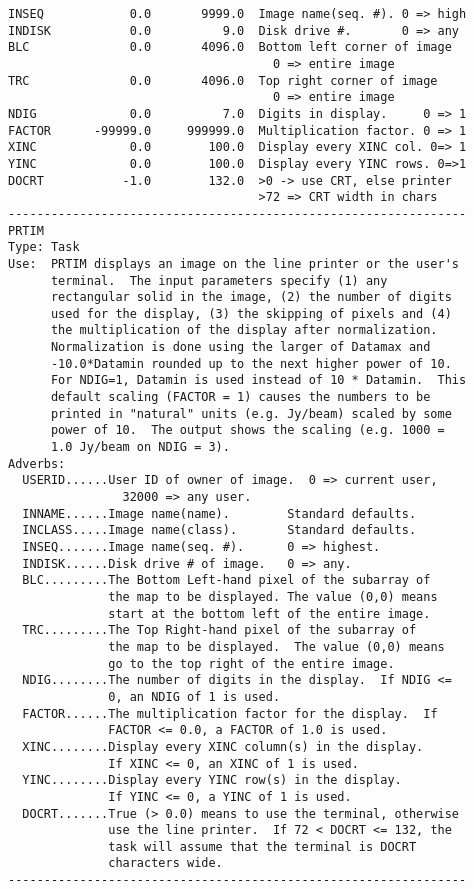 \begin{verbatim}
INSEQ            0.0       9999.0  Image name(seq. #). 0 => high
INDISK           0.0          9.0  Disk drive #.       0 => any
BLC              0.0       4096.0  Bottom left corner of image
                                     0 => entire image
TRC              0.0       4096.0  Top right corner of image
                                     0 => entire image
NDIG             0.0          7.0  Digits in display.     0 => 1
FACTOR      -99999.0     999999.0  Multiplication factor. 0 => 1
XINC             0.0        100.0  Display every XINC col. 0=> 1
YINC             0.0        100.0  Display every YINC rows. 0=>1
DOCRT           -1.0        132.0  >0 -> use CRT, else printer
                                   >72 => CRT width in chars
----------------------------------------------------------------
PRTIM
Type: Task
Use:  PRTIM displays an image on the line printer or the user's
      terminal.  The input parameters specify (1) any
      rectangular solid in the image, (2) the number of digits
      used for the display, (3) the skipping of pixels and (4)
      the multiplication of the display after normalization.
      Normalization is done using the larger of Datamax and
      -10.0*Datamin rounded up to the next higher power of 10.
      For NDIG=1, Datamin is used instead of 10 * Datamin.  This
      default scaling (FACTOR = 1) causes the numbers to be
      printed in "natural" units (e.g. Jy/beam) scaled by some
      power of 10.  The output shows the scaling (e.g. 1000 =
      1.0 Jy/beam on NDIG = 3).
Adverbs:
  USERID......User ID of owner of image.  0 => current user,
                32000 => any user.
  INNAME......Image name(name).        Standard defaults.
  INCLASS.....Image name(class).       Standard defaults.
  INSEQ.......Image name(seq. #).      0 => highest.
  INDISK......Disk drive # of image.   0 => any.
  BLC.........The Bottom Left-hand pixel of the subarray of
              the map to be displayed. The value (0,0) means
              start at the bottom left of the entire image.
  TRC.........The Top Right-hand pixel of the subarray of
              the map to be displayed.  The value (0,0) means
              go to the top right of the entire image.
  NDIG........The number of digits in the display.  If NDIG <=
              0, an NDIG of 1 is used.
  FACTOR......The multiplication factor for the display.  If
              FACTOR <= 0.0, a FACTOR of 1.0 is used.
  XINC........Display every XINC column(s) in the display.
              If XINC <= 0, an XINC of 1 is used.
  YINC........Display every YINC row(s) in the display.
              If YINC <= 0, a YINC of 1 is used.
  DOCRT.......True (> 0.0) means to use the terminal, otherwise
              use the line printer.  If 72 < DOCRT <= 132, the
              task will assume that the terminal is DOCRT
              characters wide.
----------------------------------------------------------------


\end{verbatim}
